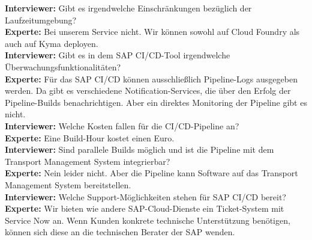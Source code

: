 \begin{linenumbers}
\textbf{Interviewer:} Gibt es irgendwelche Einschränkungen bezüglich der Laufzeitumgebung?\\
\textbf{Experte:} Bei unserem Service nicht. Wir können sowohl auf Cloud Foundry als auch auf Kyma deployen.\\
\textbf{Interviewer:} Gibt es in dem SAP CI/CD-Tool irgendwelche Überwachungsfun\-ktionalitäten?\\ 
\textbf{Experte:} Für das SAP CI/CD können ausschließlich Pipeline-Logs ausgegeben werden. Da gibt es verschiedene Notification-Services, die über den Erfolg der Pipeline-Builds benachrichtigen. Aber ein direktes Monitoring der Pipeline gibt es nicht.\\
\textbf{Interviewer:} Welche Kosten fallen für die CI/CD-Pipeline an?\\
\textbf{Experte:} Eine Build-Hour kostet einen Euro.\\
\textbf{Interviewer:} Sind parallele Builds möglich und ist die Pipeline mit dem Transport Management System integrierbar?\\
\textbf{Experte:} Nein leider nicht. Aber die Pipeline kann Software auf das Transport Management System bereitstellen.\\
\textbf{Interviewer:} Welche Support-Möglichkeiten stehen für SAP CI/CD bereit?\\
\textbf{Experte:} Wir bieten wie andere SAP-Cloud-Dienste ein Ticket-System mit Service Now an. Wenn Kunden konkrete technische Unterstützung benötigen, können sich diese an die technischen Berater der SAP wenden.\\
\end{linenumbers}
\newpage
\resetlinenumber
